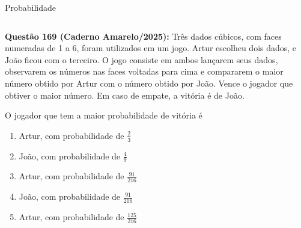 \documentclass[aspectratio=169, t, 8pt]{beamer}
\begin{document}
    \begin{frame}{Probabilidade}
        \begin{columns}[totalwidth=.9\textwidth]
            \begin{column}{\textwidth}
                {\textcolor{black!65}{\bf Questão 169 (Caderno Amarelo/2025):}} Três dados cúbicos, com faces numeradas de 1 a 6, foram utilizados em um jogo. Artur escolheu dois dados, e João ficou com o terceiro. O jogo consiste em ambos lançarem seus dados, observarem os números nas faces voltadas para cima e compararem o maior número obtido por Artur com o número obtido por João. Vence o jogador que obtiver o maior número. Em caso de empate, a vitória é de João.
                
                O jogador que tem a maior probabilidade de vitória é

                \vspace{1em}

                {
                \raggedright
                \begin{enumerate}[label=\alph*.), font=\bfseries]
                    \item Artur, com probabilidade de $\displaystyle \frac{2}{3}$\vspace{0.8em}
                    \item João, com probabilidade de $\displaystyle \frac{4}{9}$\vspace{0.8em}
                    \item Artur, com probabilidade de $\displaystyle \frac{91}{216}$\vspace{0.8em}
                    \item João, com probabilidade de $\displaystyle \frac{91}{216}$\vspace{0.8em}
                    \item Artur, com probabilidade de $\displaystyle \frac{125}{216}$  \vspace{0.8em}
                \end{enumerate}
                }
            \end{column}
        \end{columns}
    \end{frame}
\end{document}
